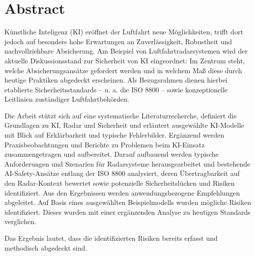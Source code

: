\chapter*{Abstract}\label{cha:abstract}


Künstliche Inteligenz (KI) eröffnet der Luftfahrt neue Möglichkeiten, trifft dort 
jedoch auf besonders hohe Erwartungen an Zuverlässigkeit, Robustheit und nachvollziehbare 
Absicherung. Am Beispiel von Luftfahrtradarsystemen wird der aktuelle Diskussionsstand zur 
Sicherheit von KI eingeordnet: Im Zentrum steht, welche Absicherungsansätze gefordert 
werden und in welchem Maß diese durch heutige Praktiken abgedeckt erscheinen. Als 
Bezugsrahmen dienen hierbei etablierte Sicherheitsstandards – u. a. die ISO 8800 – 
sowie konzeptionelle Leitlinien zuständiger Luftfahrtbehörden.

Die Arbeit stützt sich auf eine systematische Literaturrecherche, definiert die 
Grundlagen zu KI, Radar und Sicherheit und erläutert ausgewählte KI-Modelle mit Blick auf 
Erklärbarkeit und typische Fehlerbilder. Ergänzend werden Praxisbeobachtungen und Berichte 
zu Problemen beim KI-Einsatz zusammengetragen und aufbereitet. Darauf aufbauend werden typische Anforderungen 
und Szenarien für Radarsysteme herausgearbeitet und bestehende AI-Safety-Ansätze entlang 
der ISO 8800 analysiert, deren Übertragbarkeit auf den Radar-Kontext 
bewertet sowie potenzielle Sicherheitslücken und Risiken identifiziert. Aus den Ergebnissen 
werden anwendungsbezogene Empfehlungen abgeleitet. 
Auf Basis eines ausgewählten Beispielmodells wurden mögliche Risiken identifiziert. Dieses 
wurden mit einer ergänzenden Analyse zu heutigen Standards verglichen.

Das Ergebnis lautet, dass die identifizierten Risiken bereits erfasst und methodisch abgedeckt sind.

\newpage
